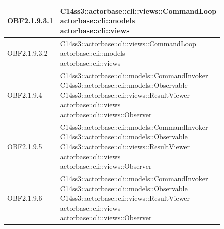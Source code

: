 \documentclass{scalatekids-article}
\begin{document}
\begin{longtable}[H]{|p{4.5cm}|p{13cm}|}
\hline
OBF2.1.9.3.1 & \multiLineCell[t]{C14ss3::actorbase::cli::views::CommandLoop\\actorbase::cli::models\\actorbase::cli::views\\}\\
\hline
OBF2.1.9.3.2 & \multiLineCell[t]{C14ss3::actorbase::cli::views::CommandLoop\\actorbase::cli::models\\actorbase::cli::views\\}\\
\hline
OBF2.1.9.4 & \multiLineCell[t]{C14ss3::actorbase::cli::models::CommandInvoker\\C14ss3::actorbase::cli::models::Observable\\C14ss3::actorbase::cli::views::ResultViewer\\actorbase::cli::views\\actorbase::cli::views::Observer\\}\\
\hline
OBF2.1.9.5 & \multiLineCell[t]{C14ss3::actorbase::cli::models::CommandInvoker\\C14ss3::actorbase::cli::models::Observable\\C14ss3::actorbase::cli::views::ResultViewer\\actorbase::cli::views\\actorbase::cli::views::Observer\\}\\
\hline
OBF2.1.9.6 & \multiLineCell[t]{C14ss3::actorbase::cli::models::CommandInvoker\\C14ss3::actorbase::cli::models::Observable\\C14ss3::actorbase::cli::views::ResultViewer\\actorbase::cli::views\\actorbase::cli::views::Observer\\}\\
\hline
\end{longtable}

\newpage
\appendix
\label{sec:appendice}

\newpage
\listoftables
\newpage
\listoffigures
\end{document}
